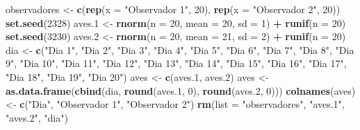 \documentclass[]{book}
\newenvironment{Shaded}{\begin{snugshade}}{\end{snugshade}}
\newcommand{\DataTypeTok}[1]{\textcolor[rgb]{0.13,0.29,0.53}{#1}}
\newcommand{\DecValTok}[1]{\textcolor[rgb]{0.00,0.00,0.81}{#1}}
\newcommand{\FloatTok}[1]{\textcolor[rgb]{0.00,0.00,0.81}{#1}}
\newcommand{\KeywordTok}[1]{\textcolor[rgb]{0.13,0.29,0.53}{\textbf{#1}}}
\newcommand{\NormalTok}[1]{#1}
\newcommand{\OperatorTok}[1]{\textcolor[rgb]{0.81,0.36,0.00}{\textbf{#1}}}
\newcommand{\StringTok}[1]{\textcolor[rgb]{0.31,0.60,0.02}{#1}}
\begin{document}
\begin{Shaded}
\begin{Highlighting}[]
\NormalTok{observadores <-}\StringTok{ }\KeywordTok{c}\NormalTok{(}\KeywordTok{rep}\NormalTok{(}\DataTypeTok{x =} \StringTok{"Observador 1"}\NormalTok{, }\DecValTok{20}\NormalTok{), }\KeywordTok{rep}\NormalTok{(}\DataTypeTok{x =} \StringTok{"Observador 2"}\NormalTok{, }\DecValTok{20}\NormalTok{))}
\KeywordTok{set.seed}\NormalTok{(}\DecValTok{2328}\NormalTok{)}
\NormalTok{aves}\FloatTok{.1}\NormalTok{ <-}\StringTok{ }\KeywordTok{rnorm}\NormalTok{(}\DataTypeTok{n =} \DecValTok{20}\NormalTok{, }\DataTypeTok{mean =} \DecValTok{20}\NormalTok{, }\DataTypeTok{sd =} \DecValTok{1}\NormalTok{) }\OperatorTok{+}\StringTok{ }\KeywordTok{runif}\NormalTok{(}\DataTypeTok{n =} \DecValTok{20}\NormalTok{)}
\KeywordTok{set.seed}\NormalTok{(}\DecValTok{3230}\NormalTok{)}
\NormalTok{aves}\FloatTok{.2}\NormalTok{ <-}\StringTok{ }\KeywordTok{rnorm}\NormalTok{(}\DataTypeTok{n =} \DecValTok{20}\NormalTok{, }\DataTypeTok{mean =} \DecValTok{21}\NormalTok{, }\DataTypeTok{sd =} \DecValTok{2}\NormalTok{) }\OperatorTok{+}\StringTok{ }\KeywordTok{runif}\NormalTok{(}\DataTypeTok{n =} \DecValTok{20}\NormalTok{)}
\NormalTok{dia <-}\StringTok{ }\KeywordTok{c}\NormalTok{(}\StringTok{"Dia 1"}\NormalTok{, }\StringTok{"Dia 2"}\NormalTok{, }\StringTok{"Dia 3"}\NormalTok{, }\StringTok{"Dia 4"}\NormalTok{, }\StringTok{"Dia 5"}\NormalTok{, }\StringTok{"Dia 6"}\NormalTok{, }\StringTok{"Dia 7"}\NormalTok{, }\StringTok{"Dia 8"}\NormalTok{, }\StringTok{"Dia 9"}\NormalTok{, }\StringTok{"Dia 10"}\NormalTok{, }\StringTok{"Dia 11"}\NormalTok{, }\StringTok{"Dia 12"}\NormalTok{, }\StringTok{"Dia 13"}\NormalTok{, }\StringTok{"Dia 14"}\NormalTok{, }\StringTok{"Dia 15"}\NormalTok{, }\StringTok{"Dia 16"}\NormalTok{, }\StringTok{"Dia 17"}\NormalTok{, }\StringTok{"Dia 18"}\NormalTok{, }\StringTok{"Dia 19"}\NormalTok{, }\StringTok{"Dia 20"}\NormalTok{)}
\NormalTok{aves <-}\StringTok{ }\KeywordTok{c}\NormalTok{(aves}\FloatTok{.1}\NormalTok{, aves}\FloatTok{.2}\NormalTok{)}
\NormalTok{aves <-}\StringTok{ }\KeywordTok{as.data.frame}\NormalTok{(}\KeywordTok{cbind}\NormalTok{(dia, }\KeywordTok{round}\NormalTok{(aves}\FloatTok{.1}\NormalTok{, }\DecValTok{0}\NormalTok{), }\KeywordTok{round}\NormalTok{(aves}\FloatTok{.2}\NormalTok{, }\DecValTok{0}\NormalTok{)))}
\KeywordTok{colnames}\NormalTok{(aves) <-}\StringTok{ }\KeywordTok{c}\NormalTok{(}\StringTok{"Dia"}\NormalTok{, }\StringTok{"Observador 1"}\NormalTok{, }\StringTok{"Observador 2"}\NormalTok{)}
\KeywordTok{rm}\NormalTok{(}\DataTypeTok{list =} \StringTok{"observadores"}\NormalTok{, }\StringTok{"aves.1"}\NormalTok{, }\StringTok{"aves.2"}\NormalTok{, }\StringTok{"dia"}\NormalTok{)}
\end{Highlighting}
\end{Shaded}
\end{document}
